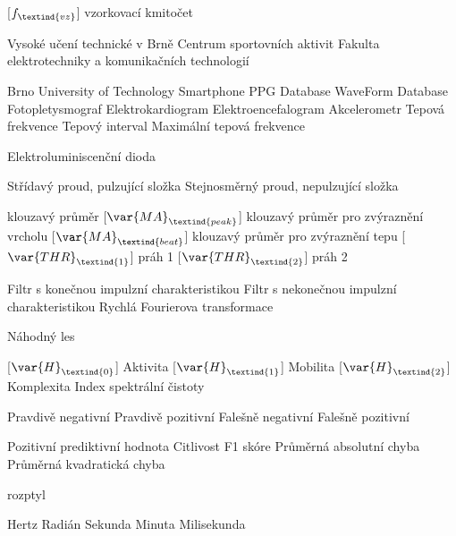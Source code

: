 \cleardoublepage
\chapter*{\listofabbrevname}
{}

\begin{acronym}[KolikMista]	%

		[\ensuremath{f_\textind{vz}}]
		{vzorkovací kmitočet}

			{Vysoké učení technické v Brně}
			{Centrum sportovních aktivit}
			{Fakulta elektrotechniky a komunikačních technologií}

		{Brno University of Technology Smartphone PPG Database}
			{WaveForm Database}
			{Fotopletysmograf}
			{Elektrokardiogram}
			{Elektroencefalogram}
			{Akcelerometr}
			{Tepová frekvence}
			{Tepový interval}
			{Maximální tepová frekvence}

			{Elektroluminiscenční dioda}

			{Střídavý proud, pulzující složka}
			{Stejnosměrný proud, nepulzující složka}

			{klouzavý průměr}
		[\ensuremath{\var{MA}_\textind{peak}}]
			{klouzavý průměr pro zvýraznění vrcholu}
		[\ensuremath{\var{MA}_\textind{beat}}]
		{klouzavý průměr pro zvýraznění tepu}
		[\ensuremath{\var{THR}_\textind{1}}]
		{práh 1}
		[\ensuremath{\var{THR}_\textind{2}}]
		{práh 2}
	
			{Filtr s konečnou impulzní charakteristikou}
			{Filtr s nekonečnou impulzní charakteristikou}
			{Rychlá Fourierova transformace}

			{Náhodný les}

		[\ensuremath{\var{H}_\textind{0}}]
		{Aktivita}
		[\ensuremath{\var{H}_\textind{1}}]
		{Mobilita}
		[\ensuremath{\var{H}_\textind{2}}]
		{Komplexita}
			{Index spektrální čistoty}

			{Pravdivě negativní}	%
			{Pravdivě pozitivní}
			{Falešně negativní}
			{Falešně pozitivní}

			{Pozitivní prediktivní hodnota}
			{Citlivost}
			{F1 skóre}
			{Průměrná absolutní chyba}
			{Průměrná kvadratická chyba}

			{rozptyl}

			{Hertz}
			{Radián}
			{Sekunda}
			{Minuta}
			{Milisekunda}


\end{acronym}
